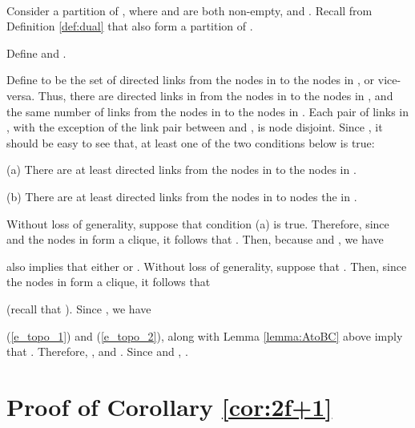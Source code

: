 \documentclass[letterpaper, 11pt]{article}
\newenvironment{proof}{\noindent {\bf Proof:}~}{\hspace*{\fill}}
\begin{document}
\begin{proof}





Consider a partition  of , where  and  are both non-empty, and . Recall from Definition \ref{def:dual} that  also
form a partition of .

Define  and .

Define  to be the set of directed links from the nodes
in  to the nodes in , or vice-versa.
Thus, there are
 directed links in 
from the nodes in  to the nodes in ,
and the same number of links from the nodes in  to the nodes
in . 
Each pair of links in , with the exception of
the link pair between  and , is node disjoint.
Since , it should be easy to see that, at least
one of the two conditions below is true:
\begin{list}{}{}
\item{(a)} There are at least  directed links from the nodes in  to the nodes in . 
\item{(b)} There are at least  directed links from the nodes in  to nodes the in . 
\end{list}
Without loss of generality, suppose that condition (a) is true.
Therefore, since 
and the nodes in  form a clique, it follows that .
Then, because  and , 
we have


 also implies that
either  or .
Without loss of generality, suppose that .
Then, since the nodes in  form a clique, it follows that

(recall that ). Since , we have 


(\ref{e_topo_1}) and (\ref{e_topo_2}), along with 
Lemma \ref{lemma:AtoBC} above imply that
. Therefore,
, and . 
Since  and , .
\end{proof}




\section{Proof of Corollary \ref{cor:2f+1}}
\label{a_cor:2f+1}
\end{document}
